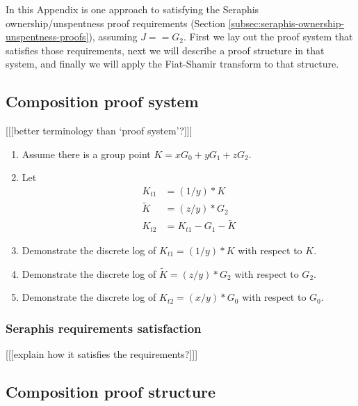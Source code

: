 \begin{appendices}
In this Appendix is one approach to satisfying the Seraphis ownership/unspentness proof requirements (Section \ref{subsec:seraphis-ownership-unspentness-proofs}), assuming $J == G_2$. First we lay out the proof system that satisfies those requirements, next we will describe a proof structure in that system, and finally we will apply the Fiat-Shamir transform \cite{fiat-shamir-transform} to that structure.


\subsection{Composition proof system}
\label{appendix:composition-proof-system}

[[[better terminology than `proof system'?]]]

\begin{enumerate}
    \item Assume there is a group point $K = x G_0 + y G_1 + z G_2$.

    \item Let\vspace{.115cm}
    \begin{align*}
        K_{t1} &= (1/y)*K \\
        \tilde{K} &= (z/y)*G_2 \\
        K_{t2} &= K_{t1} - G_1 - \tilde{K}
    \end{align*}

    \item Demonstrate the discrete log of $K_{t1} = (1/y)*K$ with respect to $K$.

    \item Demonstrate the discrete log of $\tilde{K} = (z/y)*G_2$ with respect to $G_2$.

    \item Demonstrate the discrete log of $K_{t2} = (x/y)*G_0$ with respect to $G_0$.
\end{enumerate}

\subsubsection{Seraphis requirements satisfaction}

[[[explain how it satisfies the requirements?]]]

\subsection{Composition proof structure}
\label{appendix:composition-proof-structure}


\end{appendices}
